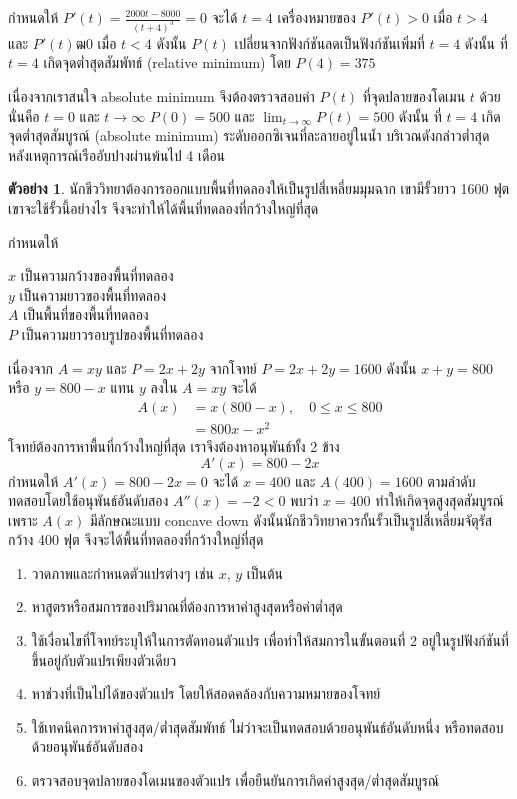 \documentclass[
]{book}
\theoremstyle{definition}
\theoremstyle{definition}
\newtheorem{example}{ตัวอย่าง}[chapter]
\theoremstyle{definition}
\theoremstyle{definition}
\theoremstyle{remark}
\begin{document}
กำหนดให้ \(\displaystyle P'(t)= \frac{2000t-8000}{(t+4)^3}=0\) จะได้ \(t=4\)
เครื่องหมายของ \(P'(t) > 0\) เมื่อ \(t > 4\) และ \(P'(t) ฒ 0\) เมื่อ \(t < 4\) ดังนั้น
\(P(t)\) เปลี่ยนจากฟังก์ชันลดเป็นฟังก์ชันเพิ่มที่ \(t=4\) ดังนั้น ที่ \(t=4\) เกิดจุดต่ำสุดสัมพัทธ์
(relative minimum) โดย \(P(4)=375\)

เนื่องจากเราสนใจ absolute minimum จึงต้องตรวจสอบค่า \(P(t)\) ที่จุดปลายของโดเมน
\(t\) ด้วย นั่นคือ \(t = 0\) และ \(t \rightarrow \infty\) \(P(0)=500\) และ
\(\lim_{t \rightarrow \infty} P(t) = 500\) ดังนั้น ที่ \(t=4\) เกิดจุดต่ำสุดสัมบูรณ์
(absolute minimum) ระดับออกซิเจนที่ละลายอยู่ในน้ำ บริเวณดังกล่าวต่ำสุด
หลังเหตุการณ์เรืออับปางผ่านพ้นไป 4 เดือน

\begin{example}
นักชีววิทยาต้องการออกแบบพื้นที่ทดลองให้เป็นรูปสี่เหลี่ยมมุมฉาก เขามีรั้วยาว 1600 ฟุต
เขาจะใช้รั้วนี้อย่างไร จึงจะทำให้ได้พื้นที่ทดลองที่กว้างใหญ่ที่สุด
\end{example}

กำหนดให้

\(x\) เป็นความกว้างของพื้นที่ทดลอง\\
\(y\) เป็นความยาวของพื้นที่ทดลอง\\
\(A\) เป็นพื้นที่ของพื้นที่ทดลอง\\
\(P\) เป็นความยาวรอบรูปของพื้นที่ทดลอง

เนื่องจาก \(A=xy\) และ \(P=2x+2y\) จากโจทย์ \(P=2x+2y=1600\) ดังนั้น \(x+y=800\) หรือ
\(y=800-x\) แทน \(y\) ลงใน \(A=xy\) จะได้ \begin{equation}   \begin{aligned}
    A(x)  &=x(800-x), \quad  0 \le x \le 800 \\
            &=800x-x^2
  \end{aligned} \end{equation} โจทย์ต้องการหาพื้นที่กว้างใหญ่ที่สุด เราจึงต้องหาอนุพันธ์ทั้ง 2 ข้าง
\[A'(x)=800-2x\] กำหนดให้ \(A'(x)=800-2x=0\) จะได้ \(x=400\) และ \(A(400)=1600\)
ตามลำดับ ทดสอบโดยใช้อนุพันธ์อันดับสอง \(A''(x)=-2<0\) พบว่า \(x=400\)
ทำให้เกิดจุดสูงสุดสัมบูรณ์ เพราะ \(A(x)\) มีลักษณะแบบ concave down
ดังนั้นนักชีววิทยาควรกั้นรั้วเป็นรูปสี่เหลี่ยมจัตุรัสกว้าง 400 ฟุต จึงจะได้พื้นที่ทดลองที่กว้างใหญ่ที่สุด

\begin{enumerate}
\def\labelenumi{\arabic{enumi}.}
\item
  วาดภาพและกำหนดตัวแปรต่างๆ เช่น \(x\), \(y\) เป็นต้น
\item
  หาสูตรหรือสมการของปริมาณที่ต้องการหาค่าสูงสุดหรือค่าต่ำสุด
\item
  ใช้เงื่อนไขที่โจทย์ระบุให้ในการตัดทอนตัวแปร เพื่อทำให้สมการในขั้นตอนที่ 2
  อยู่ในรูปฟังก์ชันที่ขึ้นอยู่กับตัวแปรเพียงตัวเดียว
\item
  หาช่วงที่เป็นไปได้ของตัวแปร โดยให้สอดคล้องกับความหมายของโจทย์
\item
  ใช้เทคนิคการหาค่าสูงสุด/ต่ำสุดสัมพัทธ์ ไม่ว่าจะเป็นทดสอบด้วยอนุพันธ์อันดับหนึ่ง
  หรือทดสอบด้วยอนุพันธ์อันดับสอง
\item
  ตรวจสอบจุดปลายของโดเมนของตัวแปร เพื่อยืนยันการเกิดค่าสูงสุด/ต่ำสุดสัมบูรณ์
\end{enumerate}
\end{document}
